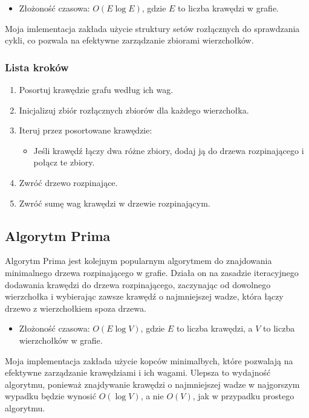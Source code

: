 \documentclass{article}
\begin{document}
\begin{itemize}
    \item Złożoność czasowa: $O(E \log E)$, gdzie $E$ to liczba krawędzi w grafie.
\end{itemize}

Moja imlementacja zakłada użycie struktury setów rozłącznych do sprawdzania cykli, co pozwala na efektywne zarządzanie zbiorami wierzchołków.

\subsubsection{Lista kroków}
\begin{enumerate}
    \item Posortuj krawędzie grafu według ich wag.
    \item Inicjalizuj zbiór rozłącznych zbiorów dla każdego wierzchołka.
    \item Iteruj przez posortowane krawędzie:
    \begin{itemize}
        \item Jeśli krawędź łączy dwa różne zbiory, dodaj ją do drzewa rozpinającego i połącz te zbiory.
    \end{itemize}
    \item Zwróć drzewo rozpinające.
    \item Zwróć sumę wag krawędzi w drzewie rozpinającym.
\end{enumerate}

\subsection{Algorytm Prima}

Algorytm Prima jest kolejnym popularnym algorytmem do znajdowania minimalnego drzewa rozpinającego w grafie.
Działa on na zasadzie iteracyjnego dodawania krawędzi do drzewa rozpinającego, zaczynając od dowolnego wierzchołka i wybierając zawsze krawędź o najmniejszej wadze, która łączy drzewo z wierzchołkiem spoza drzewa.
\begin{itemize}
    \item Złożoność czasowa: $O(E \log V)$, gdzie $E$ to liczba krawędzi, a $V$ to liczba wierzchołków w grafie.
\end{itemize}

Moja implementacja zakłada użycie kopców minimalbych, które pozwalają na efektywne zarządzanie krawędziami i ich wagami. Ulepsza to wydajność algorytmu,
ponieważ znajdywanie krawędzi o najmniejszej wadze w najgorszym wypadku będzie wynosić $O(\log V)$, a nie $O(V)$, jak w przypadku prostego algorytmu.
\end{document}
